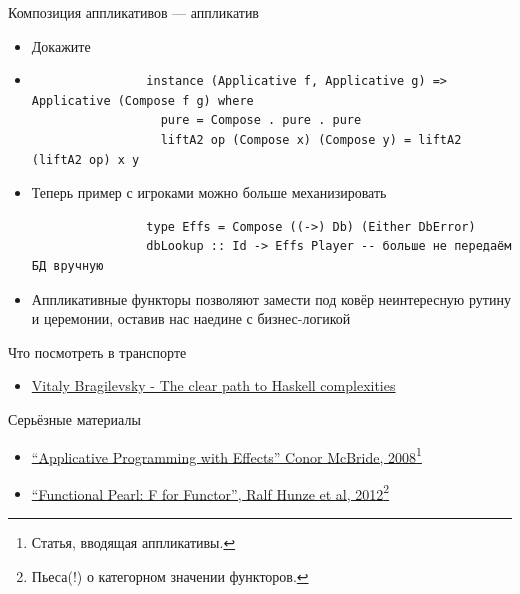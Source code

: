     \begin{frame}[fragile]{Композиция аппликативов --- аппликатив}
        \begin{itemize}
            \item[\todo] Докажите
            \item[\answer] \pause
            \begin{verbatim}
                instance (Applicative f, Applicative g) => Applicative (Compose f g) where
                  pure = Compose . pure . pure
                  liftA2 op (Compose x) (Compose y) = liftA2 (liftA2 op) x y
            \end{verbatim}
            \item Теперь пример с игроками можно больше механизировать
            \begin{verbatim}
                type Effs = Compose ((->) Db) (Either DbError)
                dbLookup :: Id -> Effs Player -- больше не передаём БД вручную
            \end{verbatim}
            \item[\NB] Аппликативные функторы позволяют замести под ковёр неинтересную рутину и церемонии, оставив нас наедине с бизнес-логикой
        \end{itemize}
    \end{frame}


    \appendix

    \begin{frame}[fragile]{Что посмотреть в транспорте}
        \begin{itemize}
            \item \href{https://youtu.be/n3H_YipBDrY?si=bsR5Fj56GEAIpAGE}{\color{blue} Vitaly Bragilevsky - The clear path to Haskell complexities}
        \end{itemize}
    \end{frame}

    \begin{frame}[fragile]{Серьёзные материалы}
        \begin{itemize}
            \item \href{https://www.staff.city.ac.uk/~ross/papers/Applicative.html}{\color{blue} ``Applicative Programming with Effects'' Conor McBride, 2008}\footnote{Статья, вводящая аппликативы.}
            \item \href{https://www.cs.ox.ac.uk/people/daniel.james/functor/functor.pdf}{\color{blue}``Functional Pearl: F for Functor'', Ralf Hunze et al, 2012}\footnote{Пьеса(!) о категорном значении функторов.}
        \end{itemize}
    \end{frame}


